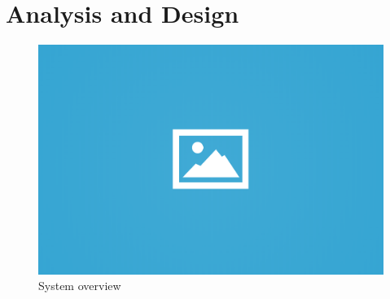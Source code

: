 \chapter{Analysis and Design}

\begin{figure}[H]
\centering
\includegraphics[width = 0.5\columnwidth]{images/ph.png}
\caption{System overview}
\label{c4}
\end{figure}